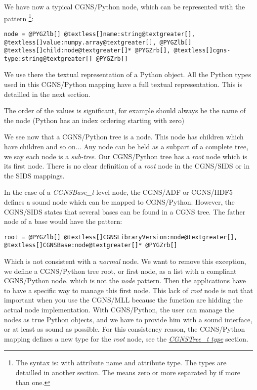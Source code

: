 \documentclass[a4paper,10pt,english]{sphinxmanual}
\begin{document}
We have now a typical CGNS/Python node, which can be represented with
the pattern \footnote{
The syntax is:  with  attribute name and  attribute
type. The types are detailled in another section. The  means
zero or more  separated by \code{,} if more than one.
}:

\begin{Verbatim}[commandchars=@\[\]]
node = @PYGZlb[] @textless[]name:string@textgreater[], @textless[]value:numpy.array@textgreater[], @PYGZlb[] @textless[]child:node@textgreater[]* @PYGZrb[], @textless[]cgns-type:string@textgreater[] @PYGZrb[]
\end{Verbatim}

We use there the textual representation of a Python object. All the Python
types used in this CGNS/Python mapping have a full textual representation.
This is detailled in the next section.

The order of the values is significant, for example  should always
be the name of the node (Python has an index ordering starting with zero)

We see now that a CGNS/Python tree is a node. This node has children
which have children and so on... Any node can be held as a subpart of a
complete tree, we say each node is a \emph{sub-tree}.
Our CGNS/Python tree has a \emph{root} node which is its first node.
There is no clear definition of a \emph{root} node in the CGNS/SIDS or in the
SIDS mappings.

In the case of a \emph{CGNSBase\_t} level node, the CGNS/ADF or CGNS/HDF5
defines a sound node which can be mapped to CGNS/Python. However, the CGNS/SIDS
states that several bases can be found in a CGNS tree. The father node of a
base would have the pattern:

\begin{Verbatim}[commandchars=@\[\]]
root = @PYGZlb[] @textless[]CGNSLibraryVersion:node@textgreater[], @textless[]CGNSBase:node@textgreater[]* @PYGZrb[]
\end{Verbatim}

Which is not consistent with a \emph{normal} node. We want to remove this exception,
we define a CGNS/Python tree root, or first node, as a list with a compliant
CGNS/Python node. which is not the \emph{node} pattern.
Then the applications have to have a specific
way to manage this first node. This lack of \emph{root} node is not that important
when you use the CGNS/MLL because the function are hidding the actual node
implementation. With CGNS/Python, the user can manage the nodes as true
Python objects, and we have to provide him with a sound interface, or at
least as sound as possible. For this consistency reason,
the CGNS/Python mapping defines a new type for the \emph{root} node,
see the {\hyperref[sids-to-python:reference-cgnstree-t]{\emph{CGNSTree\_t type}}} section.
\end{document}
